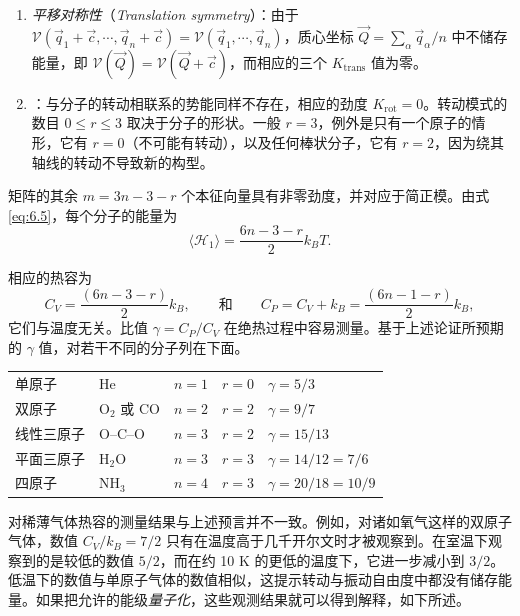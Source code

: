 \begin{enumerate}[label=(\alph*),leftmargin=2.2em,itemsep=0.2em]
\item \emph{平移对称性}（\textit{Translation symmetry}）：由于 $\mathcal V(\vec q_1+\vec c,\cdots,\vec q_n+\vec c)=\mathcal V(\vec q_1,\cdots,\vec q_n)$，质心坐标 $\vec Q=\sum_\alpha\vec q_\alpha/n$ 中不储存能量，即 $\mathcal V(\vec Q)=\mathcal V(\vec Q+\vec c)$，而相应的三个 $K_{\text{trans}}$ 值为零。
\item {}：与分子的转动相联系的势能同样不存在，相应的劲度 $K_{\text{rot}}=0$。转动模式的数目 $0\le r\le3$ 取决于分子的形状。一般 $r=3$，例外是只有一个原子的情形，它有 $r=0$（不可能有转动），以及任何棒状分子，它有 $r=2$，因为绕其轴线的转动不导致新的构型。
\end{enumerate}

矩阵的其余 $m=3n-3-r$ 个本征向量具有非零劲度，并对应于简正模。由式 \eqref{eq:6.5}，每个分子的能量为
\begin{equation}\label{eq:6.6}
\langle\mathscr H_1\rangle=\frac{6n-3-r}{2}k_BT.
\end{equation}


相应的热容为
\begin{equation}\label{eq:6.7}
C_V=\frac{(6n-3-r)}{2}k_B,\qquad\text{和}\qquad C_P=C_V+k_B=\frac{(6n-1-r)}{2}k_B,
\end{equation}
它们与温度无关。比值 $\gamma=C_P/C_V$ 在绝热过程中容易测量。基于上述论证所预期的 $\gamma$ 值，对若干不同的分子列在下面。

\begin{center}
\begin{tabular}{lllll}
单原子 & He & $n=1$ & $r=0$ & $\gamma=5/3$\\
双原子 & O$_2$ 或 CO & $n=2$ & $r=2$ & $\gamma=9/7$\\
线性三原子 & O--C--O & $n=3$ & $r=2$ & $\gamma=15/13$\\
平面三原子 & H$_2$O & $n=3$ & $r=3$ & $\gamma=14/12=7/6$\\
四原子 & NH$_3$ & $n=4$ & $r=3$ & $\gamma=20/18=10/9$
\end{tabular}
\end{center}


对稀薄气体热容的测量结果与上述预言并不一致。例如，对诸如氧气这样的双原子气体，数值 $C_V/k_B=7/2$ 只有在温度高于几千开尔文时才被观察到。在室温下观察到的是较低的数值 $5/2$，而在约 10 K 的更低的温度下，它进一步减小到 $3/2$。低温下的数值与单原子气体的数值相似，这提示转动与振动自由度中都没有储存能量。如果把允许的能级\emph{量子化}，这些观测结果就可以得到解释，如下所述。

